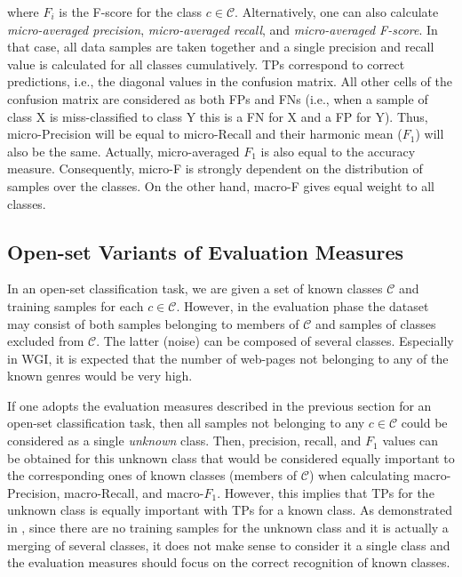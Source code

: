 \noindent where $F_i$ is the F-score for the class $c \in \mathcal{C}$. Alternatively, one can also calculate \textit{micro-averaged precision}, \textit{micro-averaged recall}, and \textit{micro-averaged F-score}. In that case, all data samples are taken together and a single precision and recall value is calculated for all classes cumulatively. TPs correspond to correct predictions, i.e., the diagonal values in the confusion matrix.  All other cells of the confusion matrix are considered as both FPs and FNs (i.e., when a sample of class X is miss-classified to class Y this is a FN for X and a FP for Y). Thus, micro-Precision will be equal to micro-Recall and their harmonic mean  ($F_{1}$) will also be the same. Actually, micro-averaged $F_{1}$ is also equal to the accuracy measure. Consequently, micro-F is strongly dependent on the distribution of samples over the classes. On the other hand, macro-F gives equal weight to all classes.

\subsection{Open-set Variants of Evaluation Measures}

In an open-set classification task, we are given a set of known classes $\mathcal{C}$ and training samples for each $c \in \mathcal{C}$. However, in the evaluation phase the dataset may consist of both samples belonging to members of $\mathcal{C}$ and samples of classes excluded from $\mathcal{C}$. The latter (noise) can be composed of several classes. Especially in WGI, it is expected that the number of web-pages not belonging to any of the known genres would be very high. 

If one adopts the evaluation measures described in the previous section for an open-set classification task, then all samples not belonging to any $c \in \mathcal{C}$ could be considered as a single \textit{unknown} class. Then, precision, recall, and $F_{1}$ values can be obtained for this unknown class that would be considered equally important to the corresponding ones of known classes (members of $\mathcal{C}$) when calculating macro-Precision, macro-Recall, and macro-$F_{1}$. However, this implies that TPs for the unknown class is equally important with TPs for a known class. As demonstrated in \parencite{mendesjunior2016}, since there are no training samples for the unknown class and it is actually a merging of several classes, it does not make sense to consider it a single class and the evaluation measures should focus on the correct recognition of known classes.

